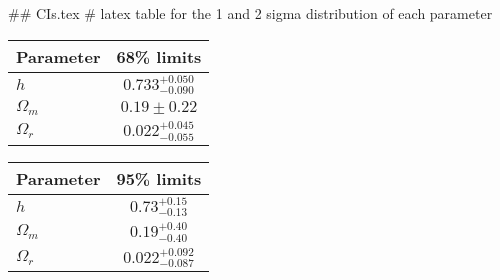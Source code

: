 ## CIs.tex
# latex table for the 1 and 2 sigma distribution of each parameter

\begin{tabular} { l  c}
 Parameter &  68\% limits\\
\hline
{\boldmath$h              $} & $0.733^{+0.050}_{-0.090}   $\\
{\boldmath$\Omega_m       $} & $0.19\pm 0.22              $\\
{\boldmath$\Omega_r       $} & $0.022^{+0.045}_{-0.055}   $\\
\hline
\end{tabular}

\begin{tabular} { l  c}
 Parameter &  95\% limits\\
\hline
{\boldmath$h              $} & $0.73^{+0.15}_{-0.13}      $\\
{\boldmath$\Omega_m       $} & $0.19^{+0.40}_{-0.40}      $\\
{\boldmath$\Omega_r       $} & $0.022^{+0.092}_{-0.087}   $\\
\hline
\end{tabular}
